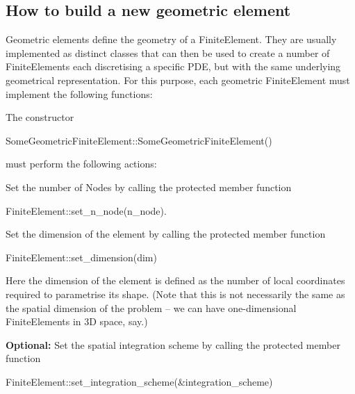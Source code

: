 \hypertarget{index_FEgeom}{}\subsection{How to build a new geometric element}\label{index_FEgeom}
Geometric elements define the geometry of a {\ttfamily Finite\+Element}. They are usually implemented as distinct classes that can then be used to create a number of {\ttfamily Finite\+Elements} each discretising a specific P\+DE, but with the same underlying geometrical representation. For this purpose, each geometric {\ttfamily Finite\+Element} must implement the following functions\+:
\begin{DoxyItemize}
\item The constructor 
\begin{DoxyCode}
SomeGeometricFiniteElement::SomeGeometricFiniteElement() 
\end{DoxyCode}
 must perform the following actions\+:
\begin{DoxyItemize}
\item Set the number of Nodes by calling the protected member function 
\begin{DoxyCode}
FiniteElement::set\_n\_node(n\_node). 
\end{DoxyCode}

\item Set the dimension of the element by calling the protected member function
\begin{DoxyCode}
FiniteElement::set\_dimension(dim)
\end{DoxyCode}
 Here the dimension of the element is defined as the number of local coordinates required to parametrise its shape. (Note that this is not necessarily the same as the spatial dimension of the problem -- we can have one-\/dimensional {\ttfamily Finite\+Elements} in 3D space, say.)
\item {\bfseries Optional\+:} Set the spatial integration scheme by calling the protected member function
\begin{DoxyCode}
FiniteElement::set\_integration\_scheme(&integration\_scheme) 
\end{DoxyCode}


\end{DoxyItemize}
\end{DoxyItemize}
